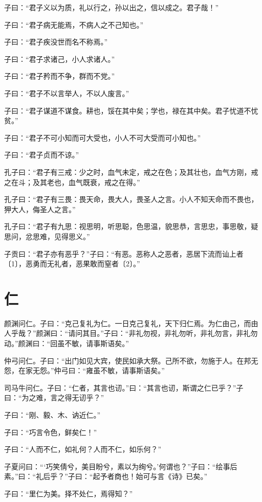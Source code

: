 \documentclass[a5paper]{ctexbook}
\begin{document}
    子曰：“君子义以为质，礼以行之，孙以出之，信以成之。君子哉！”

    子曰：“君子病无能焉，不病人之不己知也。”

    子曰：“君子疾没世而名不称焉。”

    子曰：“君子求诸己，小人求诸人。”

    子曰：“君子矜而不争，群而不党。”

    子曰：“君子不以言举人，不以人废言。”

    子曰：“君子谋道不谋食。耕也，馁在其中矣；学也，禄在其中矣。君子忧道不忧贫。”

    子曰：“君子不可小知而可大受也，小人不可大受而可小知也。”

    子曰：“君子贞而不谅。”

    孔子曰：“君子有三戒：少之时，血气未定，戒之在色；及其壮也，血气方刚，戒之在斗；及其老也，血气既衰，戒之在得。”

    孔子曰：“君子有三畏：畏天命，畏大人，畏圣人之言。小人不知天命而不畏也，狎大人，侮圣人之言。”

    孔子曰：“君子有九思：视思明，听思聪，色思温，貌思恭，言思忠，事思敬，疑思问，忿思难，见得思义。”

    子贡曰：“君子亦有恶乎？”子曰：“有恶。恶称人之恶者，恶居下流而讪上者〔1〕，恶勇而无礼者，恶果敢而窒者〔2〕。”

    \chapter{仁}

    颜渊问仁。子曰：“克己复礼为仁。一日克己复礼，天下归仁焉。为仁由己，而由人乎哉？”颜渊曰：“请问其目。”子曰：“非礼勿视，非礼勿听，非礼勿言，非礼勿动。”颜渊曰：“回虽不敏，请事斯语矣。”

    仲弓问仁。子曰：“出门如见大宾，使民如承大祭。己所不欲，勿施于人。在邦无怨，在家无怨。”仲弓曰：“雍虽不敏，请事斯语矣。”

    司马牛问仁。子曰：“仁者，其言也讱。”曰：“其言也讱，斯谓之仁已乎？”子曰：“为之难，言之得无讱乎？”

    子曰：“刚、毅、木、讷近仁。”

    子曰：“巧言令色，鲜矣仁！”

    子曰：“人而不仁，如礼何？人而不仁，如乐何？”

    子夏问曰：“‘巧笑倩兮，美目盼兮，素以为绚兮。’何谓也？”子曰：“绘事后素。”曰：“礼后乎？”子曰：“起予者商也！始可与言《诗》已矣。”

    子曰：“里仁为美。择不处仁，焉得知？”
\end{document}
